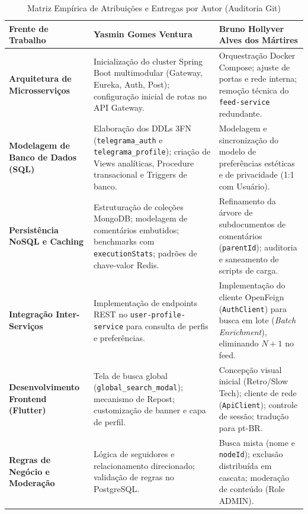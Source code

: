 \documentclass[12pt,a4paper]{report}
\begin{document}
\begin{table}[H]
\centering
\small
\caption{Matriz Empírica de Atribuições e Entregas por Autor (Auditoria Git)}
\label{tab:divisao_contribuicoes}
\begin{tabular}{@{}p{3.5cm}p{5.5cm}p{5.5cm}@{}}
\toprule
\textbf{Frente de Trabalho} & \textbf{Yasmin Gomes Ventura} & \textbf{Bruno Hollyver Alves dos Mártires} \\ \midrule
\textbf{Arquitetura de Microsserviços} & Inicialização do cluster Spring Boot multimodular (Gateway, Eureka, Auth, Post); configuração inicial de rotas no API Gateway. & Orquestração Docker Compose; ajuste de portas e rede interna; remoção técnica do \texttt{feed-service} redundante. \\ \addlinespace
\textbf{Modelagem de Banco de Dados (SQL)} & Elaboração dos DDLs 3FN (\texttt{telegrama\_auth} e \texttt{telegrama\_profile}); criação de Views analíticas, Procedure transacional e Triggers de banco. & Modelagem e sincronização do modelo de preferências estéticas e de privacidade (1:1 com Usuário). \\ \addlinespace
\textbf{Persistência NoSQL e Caching} & Estruturação de coleções MongoDB; modelagem de comentários embutidos; benchmarks com \texttt{executionStats}; padrões de chave-valor Redis. & Refinamento da árvore de subdocumentos de comentários (\texttt{parentId}); auditoria e saneamento de scripts de carga. \\ \addlinespace
\textbf{Integração Inter-Serviços} & Implementação de endpoints REST no \texttt{user-profile-service} para consulta de perfis e preferências. & Implementação do cliente OpenFeign (\texttt{AuthClient}) para busca em lote (\textit{Batch Enrichment}), eliminando $N+1$ no feed. \\ \addlinespace
\textbf{Desenvolvimento Frontend (Flutter)} & Tela de busca global (\texttt{global\_search\_modal}); mecanismo de Repost; customização de banner e capa de perfil. & Concepção visual inicial (Retro/Slow Tech); cliente de rede (\texttt{ApiClient}); controle de sessão; tradução para pt-BR. \\ \addlinespace
\textbf{Regras de Negócio e Moderação} & Lógica de seguidores e relacionamento direcionado; validação de regras no PostgreSQL. & Busca mista (nome e \texttt{nodeId}); exclusão distribuída em cascata; moderação de conteúdo (Role ADMIN). \\ \bottomrule
\end{tabular}
\end{table}
\end{document}
